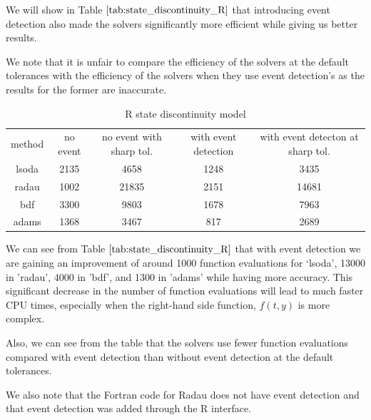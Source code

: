 We will show in Table $\ref{tab:state_discontinuity_R}$ that introducing event detection also made the solvers significantly more efficient while giving us better results.

We note that it is unfair to compare the efficiency of the solvers at the default tolerances with the efficiency of the solvers when they use event detection's as the results for the former are inaccurate.

\begin{table}[h]
\caption {R state discontinuity model} 
\label{tab:state_discontinuity_R}
\begin{center}
\begin{tabular}{ c c c c c } 
method & no event & no event with sharp tol. & with event detection & with event detecton at sharp tol.\\ 
lsoda & 2135 & 4658 & 1248 & 3435 \\
radau & 1002 & 21835 & 2151 & 14681\\
bdf & 3300 & 9803 & 1678 & 7963\\
adams & 1368 & 3467 & 817 & 2689\\
\end{tabular}
\end{center}
\end{table}

We can see from Table $\ref{tab:state_discontinuity_R}$ that with event detection we are gaining an improvement of around 1000 function evaluations for `lsoda', 13000 in 'radau', 4000 in 'bdf', and 1300 in 'adams' while having more accuracy. This significant decrease in the number of function evaluations will lead to much faster CPU times, especially when the right-hand side function, $f(t, y)$ is more complex.

Also, we can see from the table that the solvers use fewer function evaluations compared with event detection than without event detection at the default tolerances.

We also note that the Fortran code for Radau does not have event detection and that event detection was added through the R interface.

